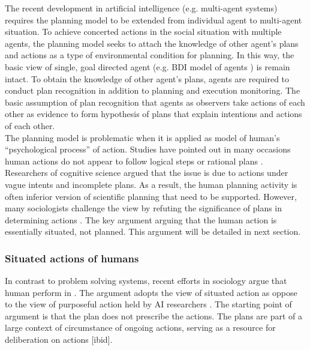The recent development in artificial intelligence (e.g. multi-agent systems) requires the planning model to be extended from individual agent to multi-agent situation. To achieve concerted actions in the social situation with multiple agents, the planning model seeks to attach the knowledge of other agent's plans and actions as a type of environmental condition for planning. In this way, the basic view of single, goal directed agent (e.g. BDI model of agents \cite{Georgeff1999}) is remain intact. To obtain the knowledge of other agent's plans, agents are required to conduct plan recognition in addition to planning and execution monitoring. The basic assumption of plan recognition that agents as observers take actions of each other as evidence to form hypothesis of plans that explain intentions and actions of each other.  \\

The planning model is problematic when it is applied as model of human's ``psychological process'' of action. Studies have pointed out in many occasions human actions do not appear to follow logical steps or rational plans \cite{Suchman1987}. Researchers of cognitive science argued that the issue is due to actions under vague intents and incomplete plans. As a result, the human planning activity is often inferior version of scientific planning that need to be supported. However, many sociologists challenge the view by refuting the significance of plans in determining actions  \cite{Suchman1987}. The key argument arguing that the human action is essentially situated, not planned. This argument will be detailed in next section.\\ 

\subsubsection{Situated actions of humans}
In contrast to problem solving systems, recent efforts in sociology argue that human perform in . The argument adopts the view of situated action as oppose to the view of purposeful action held by AI researchers \cite{Suchman1987}. The starting point of argument is that the plan does not prescribe the actions. The plans are part of a large context of circumstance of ongoing actions, serving as a resource for deliberation on actions [ibid].\\


